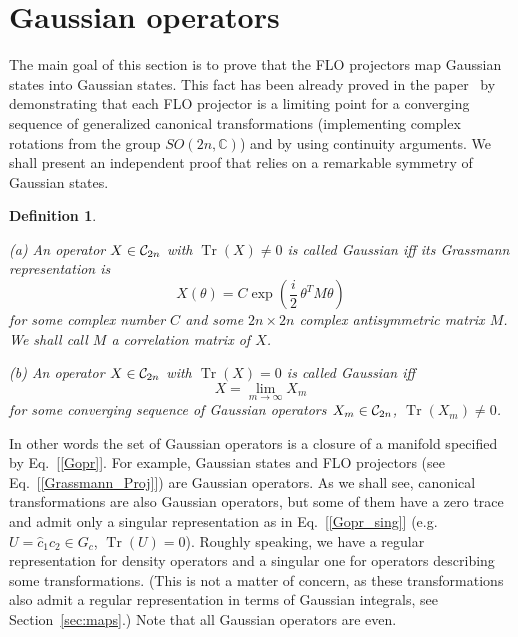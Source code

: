 \documentclass[twocolumn,showpacs,preprintnumbers,superscriptaddress]{revtex4}
\newtheorem{dfn}{Definition}
\newcommand{\CC}{\mathbb{C}}
\newcommand{\Clif}{{\cal C}}
\newcommand{\be}{\begin{equation}}
\newcommand{\ee}{\end{equation}}
\newcommand{\cop}{{\hat{c}}}
\DeclareMathOperator*{\tr}{\mathop{\mathrm{Tr}}}
\begin{document}
\section{Gaussian operators}
\label{sec:operators}


The main goal of this section is to prove that the FLO projectors map
Gaussian states into Gaussian states. This fact has been already proved in
the paper~\cite{Knill01} by demonstrating that
each FLO projector is a limiting point for a converging sequence
of generalized canonical transformations (implementing complex rotations from
the group $SO(2n,\CC)$) and by using continuity arguments. We shall present
an independent proof that relies on a remarkable symmetry of Gaussian states.

\begin{dfn}
\label{def:operators}
${} $

\noindent
(a) An operator $X\in  \Clif_{2n}$ with $\tr(X)\ne 0$ is called Gaussian iff
its Grassmann representation is 
\be\label{Gopr}
X(\theta) = C \exp{\left( \frac{i}2\, \theta^T M \theta \right)}
\ee
for some complex number $C$  and some $2n\times 2n$ complex
antisymmetric matrix $M$. We shall call $M$ a correlation matrix of $X$.

\noindent
(b) An operator $X\in \Clif_{2n}$ with $\tr(X)=0$ is called Gaussian iff
\be\label{Gopr_sing}
X=\lim_{m\to \infty} X_m
\ee
for some converging sequence of Gaussian operators $X_m\in \Clif_{2n}$,
$\tr(X_m)\ne 0$.
\end{dfn}
In other words the set of Gaussian operators is a closure of
a manifold specified by Eq.~[\ref{Gopr}]. 
 For example, Gaussian states
and FLO projectors (see Eq.~[\ref{Grassmann_Proj}]) are Gaussian operators.
As we shall see, canonical transformations are also Gaussian operators,
but some of them have a zero trace and admit only
a singular representation as in Eq.~[\ref{Gopr_sing}] (e.g.
$U=\cop_1\cop_2\in G_c$, $\tr{(U)}=0$).
Roughly speaking, we have a regular representation for density operators and a singular one
for operators describing some transformations. (This is not a matter of concern, 
as these transformations also admit a regular representation in terms of 
Gaussian integrals, see Section~\ref{sec:maps}.) 
Note that all Gaussian operators
are even.  
 
\end{document}
